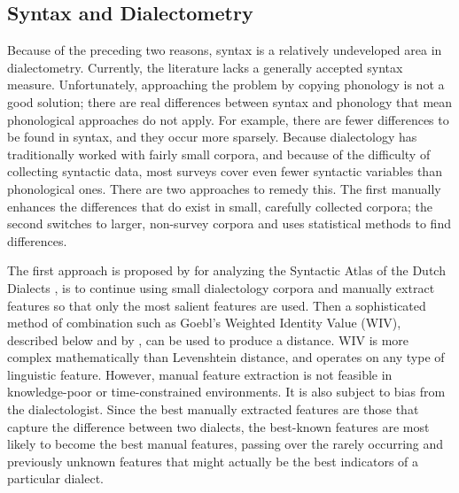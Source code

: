 
\subsection{Syntax and Dialectometry}

Because of the preceding two reasons, syntax is a relatively
undeveloped area in dialectometry. Currently, the literature lacks a
generally accepted syntax measure. Unfortunately, approaching the
problem by copying phonology is not a good solution; there are real
differences between syntax and phonology that mean phonological
approaches do not apply. For example, there are fewer differences to
be found in syntax, and they occur more sparsely.  Because
dialectology has traditionally worked with fairly small corpora, and
because of the difficulty of collecting syntactic data, most surveys
cover even fewer syntactic variables than phonological ones. There are
two approaches to remedy this. The first manually enhances the
differences that do exist in small, carefully collected corpora; the
second switches to larger, non-survey corpora and uses statistical
methods to find differences.

The first approach is proposed by  for analyzing
the Syntactic Atlas of the Dutch Dialects \cite{barbiers05}, is to
continue using small dialectology corpora and manually extract
features so that only the most salient features are used. Then a
sophisticated method of combination such as Goebl's Weighted Identity
Value (WIV), described below and by , can be used to
produce a distance. WIV is more complex mathematically than
Levenshtein distance, and operates on any type of linguistic
feature. However, manual feature extraction is not feasible in
knowledge-poor or time-constrained environments. It is also subject to
bias from the dialectologist. Since the best manually extracted
features are those that capture the difference between two dialects,
the best-known features are most likely to become the best manual
features, passing over the rarely occurring and previously unknown
features that might actually be the best indicators of a particular
dialect.

